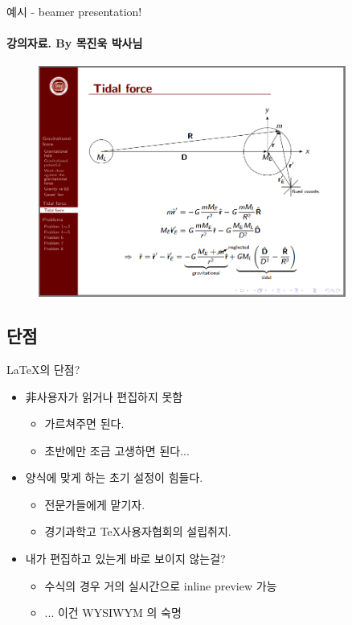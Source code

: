 \documentclass[12pt]{beamer}
\begin{document}
\begin{frame}{예시 - beamer presentation!}
	\framesubtitle{강의자료. By 목진욱 박사님}
	\begin{figure}[h]
		\centering
		\includegraphics[width=0.9\textwidth]{ex_physicsseminar.png}
	\end{figure}
\end{frame}
\subsection{단점}
\begin{frame}{\LaTeX 의 단점?}
	\begin{itemize}
		\item 非사용자가 읽거나 편집하지 못함
		\begin{itemize}
			\item 가르쳐주면 된다. 
			\item 초반에만 조금 고생하면 된다...
		\end{itemize}
		\item 양식에 맞게 하는 초기 설정이 힘들다. 
		\begin{itemize}
			\item 전문가들에게 맡기자.
			\item 경기과학고 \TeX 사용자협회의 설립취지.
		\end{itemize}
		\item 내가 편집하고 있는게 바로 보이지 않는걸?
		\begin{itemize}
			\item 수식의 경우 거의 실시간으로 inline preview 가능
			\item ... 이건 WYSIWYM 의 숙명
		\end{itemize}
	\end{itemize}
\end{frame}
\end{document}
